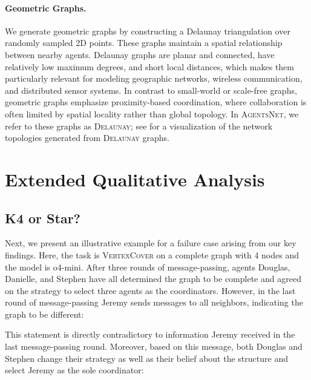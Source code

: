 \documentclass{article}
\newlength{\chatlogwidth}
\newenvironment{chatlog}{
  \noindent
  \begin{minipage}{\chatlogwidth}
  \begin{mdframed}[
    backgroundcolor=chatbg,
    leftline=true,
    rightline=false,
    topline=false,
    bottomline=false,
    linecolor=chatsideline,
    linewidth=3pt,
    innerleftmargin=15pt,
    innerrightmargin=20pt,
    innertopmargin=10pt,
    innerbottommargin=5pt
  ]
}{
  \vspace{-0.2em}
  \end{mdframed}
  \end{minipage}
}
\newcommand{\benchmark}{\textsc{AgentsNet}}
\begin{document}
\paragraph{Geometric Graphs.}
We generate geometric graphs by constructing a Delaunay triangulation over randomly sampled 2D points. These graphs maintain a spatial relationship between nearby agents. Delaunay graphs are planar and connected, have relatively low maximum degrees, and short local distances, which makes them particularly relevant for modeling geographic networks, wireless communication, and distributed sensor systems. In contrast to small-world or scale-free graphs, geometric graphs emphasize proximity-based coordination, where collaboration is often limited by spatial locality rather than global topology. In \benchmark{}, we refer to these graphs as \textsc{Delaunay}; see  for a visualization of the network topologies generated from \textsc{Delaunay} graphs.


\section{Extended Qualitative Analysis}\label{app:qualitative}

\subsection{K4 or Star?}
Next, we present an illustrative example for a failure case arising from our key findings. Here, the task is \textsc{VertexCover} on a complete graph with 4 nodes and the model is o4-mini. After three rounds of message-passing, agents Douglas, Danielle, and Stephen have all determined the graph to be complete and agreed on the strategy to select three agents as the coordinators. However, in the last round of message-passing Jeremy sends messages to all neighbors, indicating the graph to be different:

\begin{chatlog}
\end{chatlog}

This statement is directly contradictory to information Jeremy received in the last message-passing round. Moreover, based on this message, both Douglas and Stephen change their strategy as well as their belief about the structure and select Jeremy as the sole coordinator:
\end{document}
